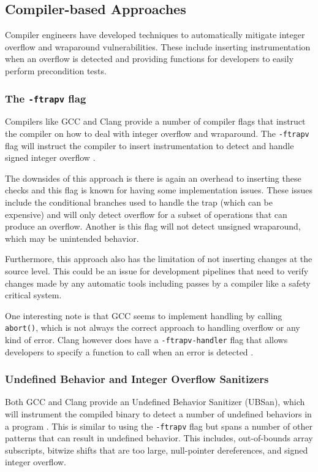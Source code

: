 \subsection{Compiler-based Approaches}

Compiler engineers have developed techniques to automatically mitigate integer overflow and wraparound vulnerabilities. These include inserting instrumentation when an overflow is detected and providing functions for developers to easily perform precondition tests.

\subsubsection{The \texttt{-ftrapv} flag}

Compilers like GCC and Clang provide a number of compiler flags that instruct the compiler on how to deal with integer overflow and wraparound. The \texttt{-ftrapv} flag will instruct the compiler to insert instrumentation to detect and handle signed integer overflow \cite{ftrapv}.

The downsides of this approach is there is again an overhead to inserting these checks and this flag is known for having some implementation issues. These issues include the conditional branches used to handle the trap (which can be expensive) and will only detect overflow for a subset of operations that can produce an overflow. Another is this flag will not detect unsigned wraparound, which may be unintended behavior.

Furthermore, this approach also has the limitation of not inserting changes at the source level. This could be an issue for development pipelines that need to verify changes made by any automatic tools including passes by a compiler like a safety critical system.

One interesting note is that GCC seems to implement handling by calling \texttt{abort()}, which is not always the correct approach to handling overflow or any kind of error. Clang however does have a \texttt{-ftrapv-handler} flag that allows developers to specify a function to call when an error is detected \cite{clang-ftrapv}.

\subsubsection{Undefined Behavior and Integer Overflow Sanitizers}

Both GCC and Clang provide an Undefined Behavior Sanitizer (UBSan), which will instrument the compiled binary to detect a number of undefined behaviors in a program \cite{gcc-ubsan}\cite{clang-ubsan}. This is similar to using the \texttt{-ftrapv} flag but spans a number of other patterns that can result in undefined behavior. This includes, out-of-bounds array subscripts, bitwize shifts that are too large, null-pointer dereferences, and signed integer overflow.

